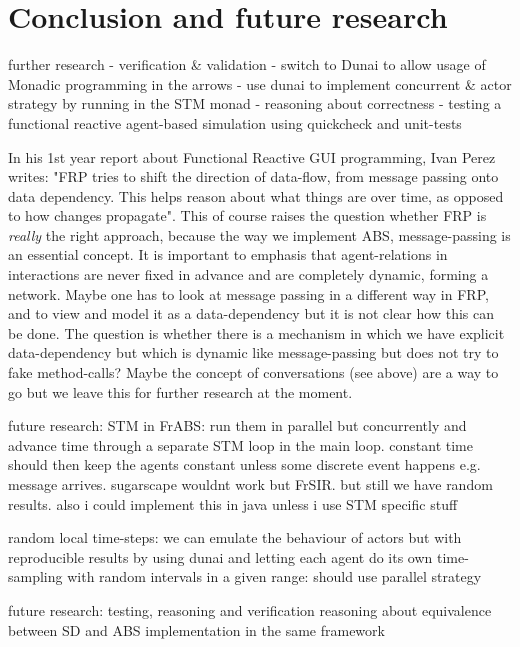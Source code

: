 \section{Conclusion and future research}

further research
	- verification \& validation
	- switch to Dunai to allow usage of Monadic programming in the arrows
	- use dunai to implement concurrent \& actor strategy by running in the STM monad
	- reasoning about correctness
	- testing a functional reactive agent-based simulation using quickcheck and unit-tests
	
In his 1st year report about Functional Reactive GUI programming, Ivan Perez writes: "FRP tries to shift the direction of data-flow, from message passing onto data dependency. This helps reason about what things are over time, as opposed to how changes propagate". This of course raises the question whether FRP is \textit{really} the right approach, because the way we implement ABS, message-passing is an essential concept. It is important to emphasis that agent-relations in interactions are never fixed in advance and are completely dynamic, forming a network. Maybe one has to look at message passing in a different way in FRP, and to view and model it as a data-dependency but it is not clear how this can be done. The question is whether there is a mechanism in which we have explicit data-dependency but which is dynamic like message-passing but does not try to fake method-calls? Maybe the concept of conversations (see above) are a way to go but we leave this for further research at the moment.

future research: STM in FrABS: run them in parallel but concurrently and advance time through a separate STM loop in the main loop. constant time should then keep the agents constant unless some discrete event happens e.g. message arrives. sugarscape wouldnt work but FrSIR. but still we have random results. also i could implement this in java unless i use STM specific stuff

random local time-steps: we can emulate the behaviour of actors but with reproducible results by using dunai and letting each agent do its own time-sampling with random intervals in a given range: should use parallel strategy

future research: testing, reasoning and verification
reasoning about equivalence between SD and ABS implementation in the same framework
